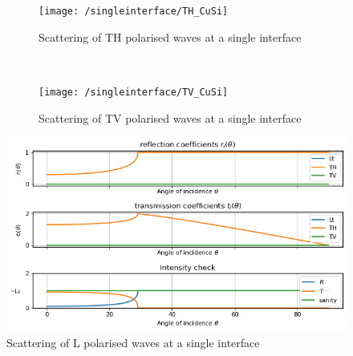 \begin{figure}[p]
    \centering
    \begin{subfigure}{0.8\textwidth}
        \texttt{[image: /singleinterface/TH\_CuSi]}
        \caption{Scattering of TH polarised waves at a single interface}
        \label{fig:singleL}
    \end{subfigure}\\ \vspace{0.75cm}
    \begin{subfigure}{0.8\textwidth}
        \texttt{[image: /singleinterface/TV\_CuSi]}
        \caption{Scattering of TV polarised waves at a single interface}
    \end{subfigure}
    \caption{}
    \label{fig:restsingle}
\end{figure}

\begin{figure}[h]
    \centering
    \includegraphics[width=\textwidth]{../pictures/singleinterface/TH_CuSi}
    \caption{Scattering of L polarised waves at a single interface}
    \label{fig:singleL}
\end{figure}

